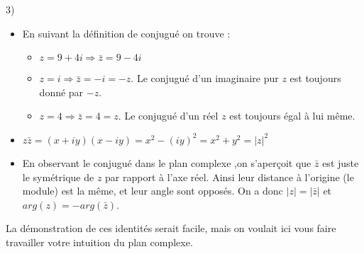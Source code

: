 \documentclass{article}
\begin{document}
3)\begin{itemize}
    \item En suivant la définition de conjugué on trouve : 
    \begin{itemize}
        \item $z = 9+4i \Rightarrow \bar z = 9-4i$
        \item $z = i  \Rightarrow \bar z = -i = -z $. Le conjugué d'un imaginaire pur $z$ est toujours donné par $-z$.
        \item $z = 4  \Rightarrow \bar z = 4 = z $. Le conjugué d'un réel $z$ est toujours égal à lui même.
    \end{itemize}
    \item $z\bar z = (x +iy)(x-iy)=x^2-(iy)^2=x^2+y^2=|z|^2 $
    \item En observant le conjugué dans le plan complexe ,on s'aperçoit que $\bar z$ est juste le symétrique de $z$ par rapport à l'axe réel. Ainsi leur distance à l'origine (le module) est la même, et leur angle sont opposés. On a donc $|z| = |\bar z|$ et $arg(z) = -arg(\bar z)$. 

\begin{center}
\end{center}
\end{itemize}
La démonstration de ces identités serait facile, mais on voulait ici vous faire travailler votre intuition du plan complexe. \\
\end{document}
